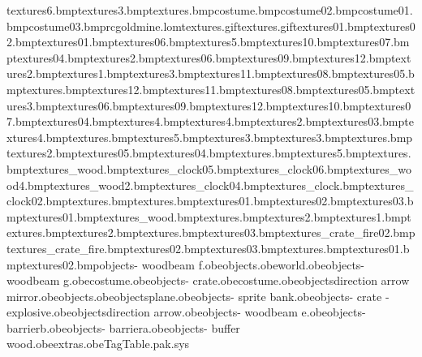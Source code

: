 textures\minemodedge6.bmp textures\minefloor3.bmp textures\blackbits.bmp costume\indyhatband.bmp costume\indywhip02.bmp costume\indywhip01.bmp costume\indywhip03.bmp rcgoldmine.lom textures\goarrow.gif textures\goldglint.gif textures\goldnugget01.bmp textures\diamond02.bmp textures\diamond01.bmp textures\splinter06.bmp textures\minefloor5.bmp textures\minerockgolder10.bmp textures\minerockgolder07.bmp textures\minerockgolder04.bmp textures\minelights2.bmp textures\minerockgolder06.bmp textures\minerockgolder09.bmp textures\minerockgolder12.bmp textures\minejoiner2.bmp textures\minelights1.bmp textures\minelights3.bmp textures\minerockgolder11.bmp textures\minerockgolder08.bmp textures\minerockgolder05.bmp textures\minejoiner.bmp textures\minefloor12.bmp textures\minerockblue11.bmp textures\minerockblue08.bmp textures\minerockblue05.bmp textures\minejoiner3.bmp textures\minerockblue06.bmp textures\minerockblue09.bmp textures\minerockblue12.bmp textures\minerockblue10.bmp textures\minerockblue07.bmp textures\minerockblue04.bmp textures\minejoiner4.bmp textures\minefloor4.bmp textures\crystals2.bmp textures\splinter03.bmp textures\crystals4.bmp textures\crystals.bmp textures\crystals5.bmp textures\crystals3.bmp textures\stalatites3.bmp textures\stalatites.bmp textures\stalatites2.bmp textures\splinter05.bmp textures\splinter04.bmp textures\turntable.bmp textures\minemodedge5.bmp textures\minefloor.bmp textures\spookhouse_wood.bmp textures\station_clock05.bmp textures\station_clock06.bmp textures\mine_wood4.bmp textures\mine_wood2.bmp textures\station_clock04.bmp textures\station_clock.bmp textures\station_clock02.bmp textures\sand.bmp textures\sleeper.bmp textures\minerockblue01.bmp textures\loggin02.bmp textures\loggin03.bmp textures\loggin01.bmp textures\track_wood.bmp textures\woodplanks.bmp textures\aquaplanks2.bmp textures\aquapyratesign1.bmp textures\aquaplanks.bmp textures\aquapyratesign2.bmp textures\magenta.bmp textures\tazstopwood03.bmp textures\const_crate_fire02.bmp textures\const_crate_fire.bmp textures\goldnugget02.bmp textures\goldnugget03.bmp textures\pickaxe.bmp textures\splinter01.bmp textures\splinter02.bmp objects\bank - woodbeam f.obe objects\checkpoints.obe world.obe objects\bank - woodbeam g.obe costume\indywhip.obe objects\bank - crate.obe costume\indyhat.obe objects\multi direction arrow mirror.obe objects\startposition.obe objects\death plane.obe objects\bank - sprite bank.obe objects\bank - crate - explosive.obe objects\multi direction arrow.obe objects\bank - woodbeam e.obe objects\bank - barrierb.obe objects\bank - barriera.obe objects\bank - buffer wood.obe extras\minecart.obe TagTable.pak.sys 